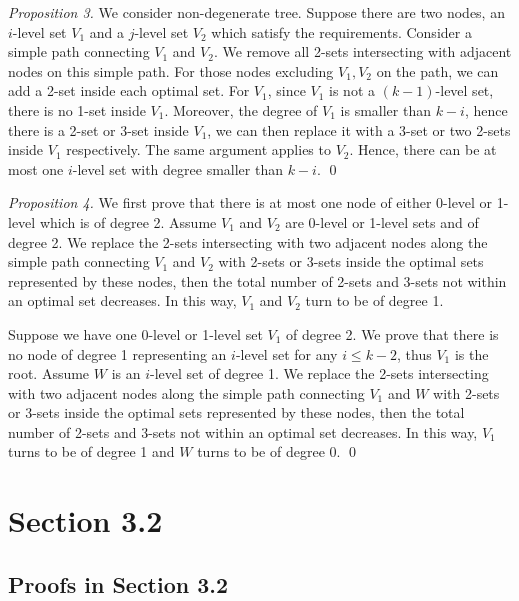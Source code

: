 \documentclass[runningheads,a4paper]{llncs}
\numberwithin{equation}{section}
\begin{document}
\begin{proof}[Proposition 3]
We consider non-degenerate tree. Suppose there are two nodes, an $i$-level set $V_1$ and a $j$-level set $V_2$ which satisfy the requirements. Consider a simple path connecting $V_1$ and $V_2$. We remove all 2-sets intersecting with adjacent nodes on this simple path. For those nodes excluding $V_1,V_2$ on the path, we can add a 2-set inside each optimal set. For $V_1$, since $V_1$ is not a $(k-1)$-level set, there is no 1-set inside $V_1$. Moreover, the degree of $V_1$ is smaller than $k-i$, hence there is a 2-set or 3-set inside $V_1$, we can then replace it with a 3-set or two 2-sets inside $V_1$ respectively. The same argument applies to $V_2$. Hence, there can be at most one $i$-level set with degree smaller than $k-i$. \qed
\end{proof}

\begin{proof}[Proposition 4]
We first prove that there is at most one node of either 0-level or 1-level which is of degree 2. Assume $V_1$ and $V_2$ are 0-level or 1-level sets and of degree 2. We replace the 2-sets intersecting with two adjacent nodes along the simple path connecting $V_1$ and $V_2$ with 2-sets or 3-sets inside the optimal sets represented by these nodes, then the total number of 2-sets and 3-sets not within an optimal set decreases. In this way, $V_1$ and $V_2$ turn to be of degree 1.

Suppose we have one 0-level or 1-level set $V_1$ of degree 2. We prove that there is no node of degree 1 representing an $i$-level set for any $i\leq k-2$, thus $V_1$ is the root. Assume $W$ is an $i$-level set of degree 1. We replace the 2-sets intersecting with two adjacent nodes along the simple path connecting $V_1$ and $W$ with 2-sets or 3-sets inside the optimal sets represented by these nodes, then the total number of 2-sets and 3-sets not within an optimal set decreases. In this way, $V_1$ turns to be of degree 1 and $W$ turns to be of degree 0. \qed
\end{proof}


\section{Section 3.2}

\subsection{Proofs in Section 3.2}
\end{document}
